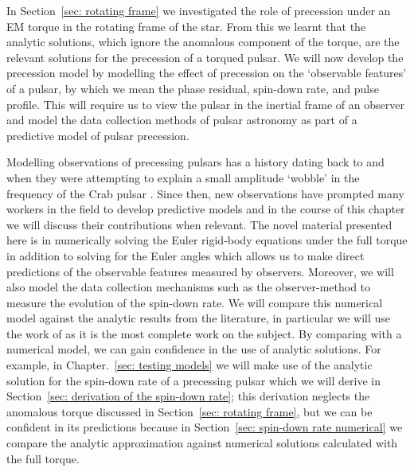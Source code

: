 \documentclass[../full_thesis/full_thesis.tex]{subfiles}
\begin{document}
In Section~\ref{sec: rotating frame} we investigated the role of precession
under an EM torque in the rotating frame of the star. From this we learnt that
the \citet{Goldreich1970} analytic solutions, which ignore the anomalous
component of the \citet{Deutsch1955} torque, are the relevant solutions for the
precession of a torqued pulsar. We will now develop the precession model by
modelling the effect of precession on the `observable features' of a pulsar, by
which we mean the phase residual, spin-down rate, and pulse profile.  This will
require us to view the pulsar in the inertial frame of an observer and model
the data collection methods of pulsar astronomy as part of a predictive model
of pulsar precession.

Modelling observations of precessing pulsars has a history dating back to
\citet{Ruderman1970} and \citet{chiuderi1970shape} when they were attempting to
explain a small amplitude `wobble' in the frequency of the Crab pulsar
\citep{Richards1969, Richards1969b}. Since then, new observations have prompted
many workers in the field to develop predictive models and in the course of
this chapter we will discuss their contributions when relevant.  The novel
material presented here is in numerically solving the Euler rigid-body
equations under the full \citet{Deutsch1955} torque in addition to solving for
the Euler angles which allows us to make direct predictions of the observable
features measured by observers. Moreover, we will also model the data
collection mechanisms such as the observer-method to measure the evolution of
the spin-down rate. We will compare this numerical model against the analytic
results from the literature, in particular we will use the work of
\citet{Jones2001} as it is the most complete work on the subject. By comparing
with a numerical model, we can gain confidence in the use of analytic
solutions. For example, in Chapter.~\ref{sec: testing models} we will make use
of the analytic solution for the spin-down rate of a precessing pulsar which we
will derive in Section~\ref{sec: derivation of the spin-down rate}; this
derivation neglects the anomalous torque discussed in Section~\ref{sec:
rotating frame}, but we can be confident in its predictions because in
Section~\ref{sec: spin-down rate numerical} we compare the analytic
approximation against numerical solutions calculated with the full torque.
\end{document}
